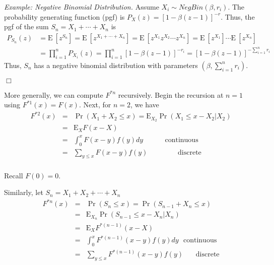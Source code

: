 \documentclass[12pt,letterpaper]{article}
\begin{document}
\noindent \textit{Example: Negative Binomial Distribution.} Assume $X_i \sim NegBin(\beta, r_i)$. The probability generating function (pgf) is $P_X(z) = \left[1-\beta(z-1) \right]^{-r}$. Thus, the pgf of the sum $S_n =X_1+\cdots+X_n$ is
\begin{align*}
P_{S_n}(z) &= \mathrm{E~}\left[ z^{S_n} \right] = \mathrm{E~}\left[ z^{X_1+\cdots+X_n} \right] = \mathrm{E~}\left[ z^{X_1} z^{X_2} \cdots z^{X_n} \right] = \mathrm{E~}\left[z^{X_1}\right] \cdots \mathrm{E~}\left[z^{X_n}\right] \\
&= \prod_{i=1}^n P_{X_i}(z) = \prod_{i=1}^n \left[1-\beta(z-1) \right]^{-r_i} = \left[1-\beta(z-1) \right]^{-\sum_{i=1}^n r_i}
\end{align*}
Thus, $S_n$ has a negative binomial distribution with parameters $(\beta, \sum_{i=1}^n r_i)$.
\begin{flushright}$\Box$\end{flushright}


More generally, we can compute $F^{\ast n}$ recursively. Begin the recursion at $n=1$ using $F^{\ast 1} \left(x \right) =F(x)$. Next, for $n=2$, we have
\begin{eqnarray*}
F^{\ast 2} \left(x \right) &=& \Pr(X_1 + X_2 \le x) = \mathrm{E}_{X_2} \Pr(X_1 \le x - X_2|X_2)\\
&=& \mathrm{E}_X F(x - X)\\
&=& \int_{0}^{x} F(x-y) f(y) dy \:\:\:\:\:\:\:\:\:\:\:\:\:\:\text{continuous}\\
&=& \sum_{y \le x} F(x-y) f(y) \:\:\:\:\:\:\:\:\:\:\:\:\:\:\:\:\:\:\;\text{discrete}\\
\end {eqnarray*}

Recall $F(0) = 0$.
\bigskip

Similarly, let $S_n = X_1 + X_2 + \cdots + X_n$
\begin{eqnarray*}
F^{\ast n}\left(x\right) &=& \Pr(S_n \le x) = \Pr(S_{n-1} + X_n \le x)\\
&=&\mathrm{E}_{X_n}\Pr(S_{n-1} \le x - X_n|X_n)\\
&=&\mathrm{E}_X F^{\ast(n-1)}(x - X)\\
&=& \int_{0}^{x} F^{\ast(n-1)}(x-y)f(y)dy \:\:\:\text{continuous}\\
&=& \sum_{y \le x} F^{\ast(n-1)}(x-y)f(y) \:\:\:\:\:\:\:\:\text{discrete}\\
\end{eqnarray*}
\bigskip
\end{document}
